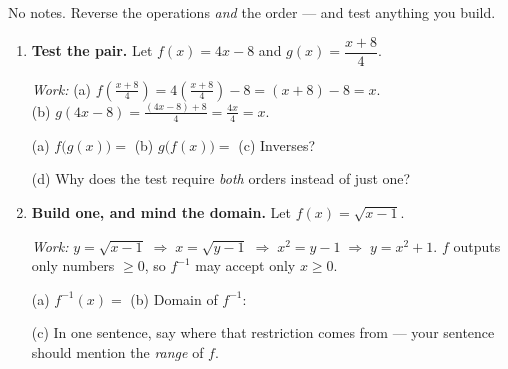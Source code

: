\documentclass[10pt]{article}
\begin{document}
\namedateperiod

\vspace{0.08in}

No notes. Reverse the operations \emph{and} the order --- and test anything you build.

\begin{enumerate}[leftmargin=1.8em, itemsep=10pt]
  \item \textbf{Test the pair.} Let $f(x)=4x-8$ and $g(x)=\dfrac{x+8}{4}$.

        {\small \emph{Work:} (a) $f\!\left(\frac{x+8}{4}\right)=4\!\left(\frac{x+8}{4}\right)-8
        =(x+8)-8=x$. \\
        (b) $g(4x-8)=\frac{(4x-8)+8}{4}=\frac{4x}{4}=x$.}

        (a) $f\big(g(x)\big)=$  \hspace{0.35in}
        (b) $g\big(f(x)\big)=$  \hspace{0.35in}
        (c) Inverses? 

        \vspace{4pt}
        (d) Why does the test require \emph{both} orders instead of just one? 

  \item \textbf{Build one, and mind the domain.} Let $f(x)=\sqrt{x-1}$.

        {\small \emph{Work:} $y=\sqrt{x-1}\;\Rightarrow\; x=\sqrt{y-1}\;\Rightarrow\; x^{2}=y-1
        \;\Rightarrow\; y=x^{2}+1$. \; $f$ outputs only numbers $\ge0$, so $f^{-1}$ may accept only
        $x\ge0$.}

        (a) $f^{-1}(x)=$  \hspace{0.3in}
        (b) Domain of $f^{-1}$: 

        \vspace{5pt}
        (c) In one sentence, say where that restriction comes from --- your sentence should mention
        the \emph{range} of $f$. 


\end{enumerate}
\end{document}
